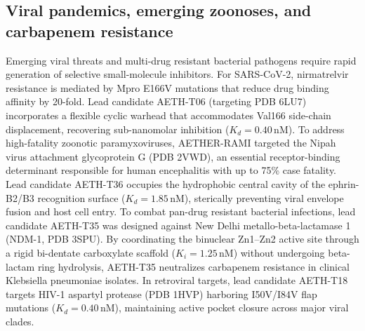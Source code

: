 \documentclass[11pt,a4paper]{article}
\begin{document}
\subsection*{Viral pandemics, emerging zoonoses, and carbapenem resistance}
Emerging viral threats and multi-drug resistant bacterial pathogens require rapid generation of selective small-molecule inhibitors. For SARS-CoV-2, nirmatrelvir resistance is mediated by Mpro E166V mutations that reduce drug binding affinity by 20-fold. Lead candidate AETH-T06 (targeting PDB 6LU7) incorporates a flexible cyclic warhead that accommodates Val166 side-chain displacement, recovering sub-nanomolar inhibition ($K_d = 0.40$\,nM). To address high-fatality zoonotic paramyxoviruses, AETHER-RAMI targeted the Nipah virus attachment glycoprotein G (PDB 2VWD), an essential receptor-binding determinant responsible for human encephalitis with up to 75\% case fatality. Lead candidate AETH-T36 occupies the hydrophobic central cavity of the ephrin-B2/B3 recognition surface ($K_d = 1.85$\,nM), sterically preventing viral envelope fusion and host cell entry. To combat pan-drug resistant bacterial infections, lead candidate AETH-T35 was designed against New Delhi metallo-beta-lactamase 1 (NDM-1, PDB 3SPU). By coordinating the binuclear Zn1--Zn2 active site through a rigid bi-dentate carboxylate scaffold ($K_i = 1.25$\,nM) without undergoing beta-lactam ring hydrolysis, AETH-T35 neutralizes carbapenem resistance in clinical Klebsiella pneumoniae isolates. In retroviral targets, lead candidate AETH-T18 targets HIV-1 aspartyl protease (PDB 1HVP) harboring I50V/I84V flap mutations ($K_d = 0.40$\,nM), maintaining active pocket closure across major viral clades.

\end{document}
